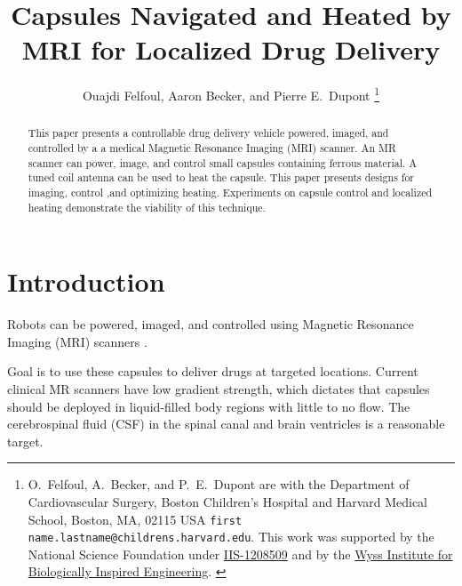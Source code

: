 \documentclass[letterpaper, 10 pt, conference]{ieeeconf}
\begin{document}

\title{\LARGE \bf Capsules Navigated and Heated by MRI for Localized Drug Delivery}
\author{Ouajdi Felfoul, Aaron Becker, and Pierre E.\ Dupont%
\thanks{{O.~Felfoul, A.~Becker, and P.~E.~Dupont are with the Department of Cardiovascular Surgery,  Boston Children's Hospital and Harvard Medical School, Boston, MA, 02115 USA {\tt\small first name.lastname@childrens.harvard.edu}. This work was supported by the National Science Foundation under
\href{http://nsf.gov/awardsearch/showAward?AWD_ID=1208509}{IIS-1208509} and by the \href{http://wyss.harvard.edu/}{Wyss Institute for Biologically Inspired Engineering}.  
}
} %
} %
\maketitle

\begin{abstract}
This paper presents a controllable drug delivery vehicle powered, imaged, and controlled by a a medical Magnetic Resonance Imaging (MRI) scanner. An MR scanner can power, image, and control small capsules containing ferrous material.   A tuned coil antenna can be used to heat the capsule. This paper presents designs for imaging, control ,and optimizing heating.  Experiments on capsule control and localized heating demonstrate the viability of this technique. 
\end{abstract}

\section{Introduction}\label{sec:Intro}

Robots can be powered, imaged, and controlled using Magnetic Resonance Imaging (MRI) scanners  \cite{Vartholomeos2012,Vartholomeos2013,Chanu2008}.     

Goal is to use these capsules to deliver drugs at targeted locations. Current clinical MR scanners have low gradient strength, which dictates that capsules should be deployed in liquid-filled body regions with little to no flow. The cerebrospinal fluid (CSF) in the spinal canal and brain ventricles is a reasonable target.  
\end{document}
